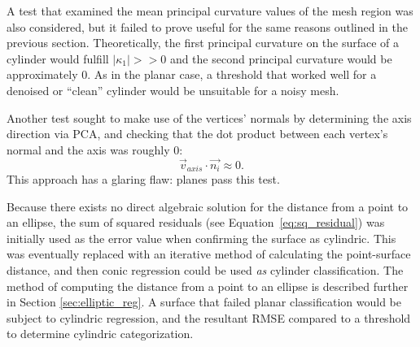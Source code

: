 A test that examined the mean principal curvature values of the mesh region was also considered, but it failed to prove useful for the same reasons outlined in the previous section.
Theoretically, the first principal curvature on the surface of a cylinder would fulfill $|\kappa_1| >> 0$ and the second principal curvature would be approximately 0.
As in the planar case, a threshold that worked well for a denoised or ``clean'' cylinder would be unsuitable for a noisy mesh.

Another test sought to make use of the vertices' normals by determining the axis direction via PCA, and checking that the dot product between each vertex's normal and the axis was roughly 0:
\begin{equation*}
	\vec{v}_{axis} \cdot \vec{n_i} \approx 0.
\end{equation*}
This approach has a glaring flaw: planes pass this test.


Because there exists no direct algebraic solution for the distance from a point to an ellipse, the sum of squared residuals (see Equation~\ref{eq:sq_residual}) was initially used as the error value when confirming the surface as cylindric.
This was eventually replaced with an iterative method of calculating the point-surface distance, and then conic regression could be used \textit{as} cylinder classification.
The method of computing the distance from a point to an ellipse is described further in Section \ref{sec:elliptic_reg}.
A surface that failed planar classification would be subject to cylindric regression, and the resultant RMSE compared to a threshold to determine cylindric categorization.

